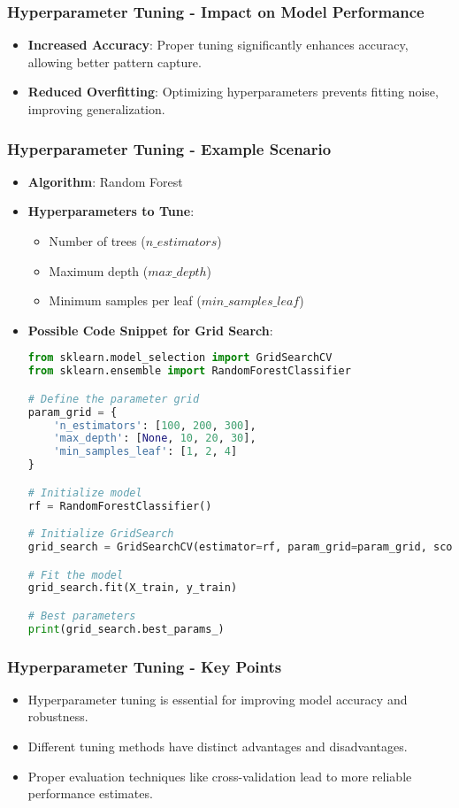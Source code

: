 \documentclass[aspectratio=169]{beamer}
\begin{document}
\begin{frame}[fragile]
    \frametitle{Hyperparameter Tuning - Impact on Model Performance}
    \begin{itemize}
        \item \textbf{Increased Accuracy}: Proper tuning significantly enhances accuracy, allowing better pattern capture.
        \item \textbf{Reduced Overfitting}: Optimizing hyperparameters prevents fitting noise, improving generalization.
    \end{itemize}
\end{frame}

\begin{frame}[fragile]
    \frametitle{Hyperparameter Tuning - Example Scenario}
    \begin{itemize}
        \item \textbf{Algorithm}: Random Forest
        \item \textbf{Hyperparameters to Tune}:
        \begin{itemize}
            \item Number of trees ($n\_estimators$)
            \item Maximum depth ($max\_depth$)
            \item Minimum samples per leaf ($min\_samples\_leaf$)
        \end{itemize}
        \item \textbf{Possible Code Snippet for Grid Search}:
        \begin{lstlisting}[language=Python]
from sklearn.model_selection import GridSearchCV
from sklearn.ensemble import RandomForestClassifier

# Define the parameter grid
param_grid = {
    'n_estimators': [100, 200, 300],
    'max_depth': [None, 10, 20, 30],
    'min_samples_leaf': [1, 2, 4]
}

# Initialize model
rf = RandomForestClassifier()

# Initialize GridSearch
grid_search = GridSearchCV(estimator=rf, param_grid=param_grid, scoring='accuracy', cv=5)

# Fit the model
grid_search.fit(X_train, y_train)

# Best parameters
print(grid_search.best_params_)
        \end{lstlisting}
    \end{itemize}
\end{frame}

\begin{frame}[fragile]
    \frametitle{Hyperparameter Tuning - Key Points}
    \begin{itemize}
        \item Hyperparameter tuning is essential for improving model accuracy and robustness.
        \item Different tuning methods have distinct advantages and disadvantages.
        \item Proper evaluation techniques like cross-validation lead to more reliable performance estimates.
    \end{itemize}
\end{frame}
\end{document}

